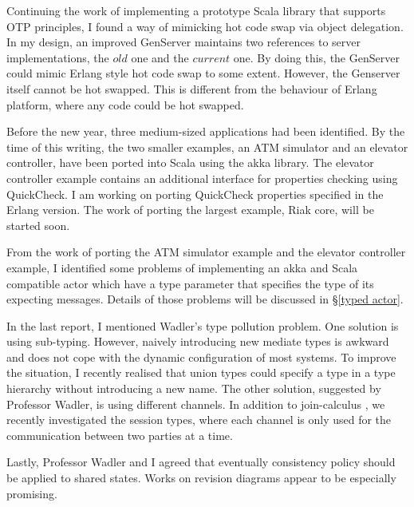 Continuing the work of implementing a prototype Scala library that supports OTP principles, I found a way of mimicking hot code swap via object delegation.  In my design, an improved GenServer maintains two references to server implementations, the $old$ one and the $current$ one.  By doing this, the GenServer could mimic Erlang style hot code swap to some extent.  However, the Genserver itself cannot be hot swapped.  This is different from the behaviour of Erlang platform, where any code could be hot swapped.

Before the new year, three medium-sized applications had been identified.  By the time of this writing, the two smaller examples, an ATM simulator and an elevator controller, have been ported into Scala using the akka library\cite{akka}.  The elevator controller example contains an additional interface for properties checking using QuickCheck.  I am working on porting QuickCheck properties specified in the Erlang version.  The work of porting the largest example, Riak core\cite{riak}, will be started soon.

From the work of porting the ATM simulator example and the elevator controller example, I identified some problems of implementing an akka and Scala compatible actor which have a type parameter that specifies the type of its expecting messages.  Details of those problems will be discussed in \S\ref{typed actor}.

In the last report, I mentioned Wadler's type pollution problem.  One solution is using sub-typing.  However, naively introducing new mediate types is awkward and does not cope with the dynamic configuration of most systems.  To improve the situation, I recently realised that union types could specify a type in a type hierarchy without introducing a new name.  The other solution, suggested by Professor Wadler, is using different channels.  In addition to join-calculus\cite{full_join} , we recently investigated the session types\cite{Honda93typesfor, Honda_languageprimitives}, where each channel is only used for the communication between two parties at a time.

Lastly, Professor Wadler and I agreed that eventually consistency policy \cite{Eventually_Consistent_Transactions, Vogels_2009} should be applied to shared states.  Works on  revision diagrams\cite{Eventually_Consistent_Transactions} appear to be especially promising.